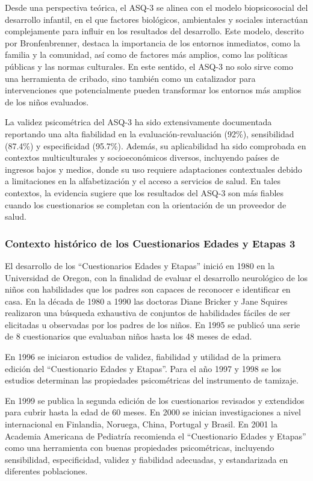 Desde una perspectiva teórica, el ASQ-3 se alinea con el modelo
biopsicosocial del desarrollo infantil, en el que factores biológicos,
ambientales y sociales interactúan complejamente para influir en los
resultados del desarrollo. Este modelo, descrito por Bronfenbrenner, destaca la
importancia de los entornos inmediatos, como la familia y la comunidad, así
como de factores más amplios, como las políticas públicas y las normas
culturales. En este sentido, el ASQ-3 no solo sirve como una herramienta de
cribado, sino también como un catalizador para intervenciones que
potencialmente pueden transformar los entornos más amplios de los niños
evaluados. \cite{Feldman3, Bronfenbrenner2005}

La validez psicométrica del ASQ-3 ha sido extensivamente documentada reportando
una alta fiabilidad en la evaluación-revaluación (92\%), sensibilidad (87.4\%)
y especificidad (95.7\%). Además, su aplicabilidad ha sido comprobada en
contextos multiculturales y socioeconómicos diversos, incluyendo países de
ingresos bajos y medios, donde su uso requiere adaptaciones contextuales debido
a limitaciones en la alfabetización y el acceso a servicios de salud. En tales
contextos, la evidencia sugiere que los resultados del ASQ-3 son más fiables
cuando los cuestionarios se completan con la orientación de un proveedor de
salud. \cite{Vameghi2013-uo, SarmientoCampos2010, Manasyan2023}

\subsubsection{Contexto histórico de los Cuestionarios Edades y Etapas 3}
El desarrollo de los ``Cuestionarios Edades y Etapas'' inició en 1980 en la
Universidad de Oregon, con la finalidad de evaluar el desarrollo neurológico de
los niños con habilidades que los padres son capaces de reconocer e identificar
en casa. En la década de 1980 a 1990 las doctoras Diane Bricker y Jane Squires
realizaron una búsqueda exhaustiva de conjuntos de habilidades fáciles de ser
elicitadas u observadas por los padres de los niños. En 1995 se publicó una
serie de 8 cuestionarios que evaluaban niños hasta los 48 meses de edad.
\cite{ASQ4decades}

En 1996 se iniciaron estudios de validez, fiabilidad y utilidad de la primera
edición del ``Cuestionario Edades y Etapas''. Para el año 1997 y 1998 se los
estudios determinan las propiedades psicométricas del instrumento de tamizaje.
\cite{ASQ4decades}

En 1999 se publica la segunda edición de los cuestionarios revisados y
extendidos para cubrir hasta la edad de 60 meses. En 2000 se inician
investigaciones a nivel internacional en Finlandia, Noruega, China, Portugal y
Brasil. En 2001 la Academia Americana de Pediatría recomienda el ``Cuestionario
Edades y Etapas'' como una herramienta con buenas propiedades psicométricas,
incluyendo sensibilidad, especificidad, validez y fiabilidad adecuadas, y
estandarizada en diferentes poblaciones. \cite{Pediatrics2001}

